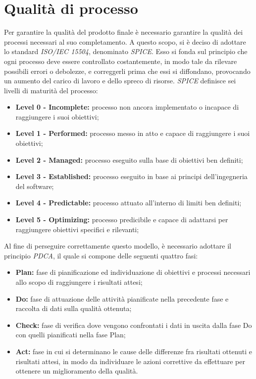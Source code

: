\newpage
\section{Qualità di processo}

	Per garantire la qualità del prodotto finale è necessario garantire la qualità dei processi necessari al suo completamento. A questo scopo, si è deciso di adottare lo standard \textit{ISO/IEC 15504}, denominato \textit{SPICE}.
	Esso si fonda sul principio che ogni processo deve essere controllato costantemente, in modo tale da rilevare possibili errori o debolezze, e correggerli prima che essi si diffondano, provocando un aumento del carico di lavoro e dello spreco di risorse.
	\textit{SPICE} definisce sei livelli di maturità del processo:
	
	\begin{itemize}
		\item \textbf{Level 0 - Incomplete:} processo non ancora implementato o incapace di raggiungere i suoi obiettivi;
		\item \textbf{Level 1 - Performed:} processo messo in atto e capace di raggiungere i suoi obiettivi;
		\item \textbf{Level 2 - Managed:} processo eseguito sulla base di obiettivi ben definiti;
		\item \textbf{Level 3 - Established:} processo eseguito in base ai principi dell’ingegneria del software; 
		\item \textbf{Level 4 - Predictable:} processo attuato all’interno di limiti ben definiti;
		\item \textbf{Level 5 - Optimizing:} processo predicibile e capace di adattarsi per raggiungere obiettivi specifici e rilevanti;
	\end{itemize}
	
	Al fine di perseguire correttamente questo modello, è necessario adottare il principio \textit{PDCA}, il quale si compone delle seguenti quattro fasi:
	
	\begin{itemize}
		\item \textbf{Plan:} fase di pianificazione ed individuazione di obiettivi e processi necessari allo scopo di raggiungere i risultati attesi;
		\item \textbf{Do:} fase di attuazione delle attività pianificate nella precedente fase e raccolta di dati sulla qualità ottenuta;
		\item \textbf{Check:} fase di verifica dove vengono confrontati i dati in uscita dalla fase Do con quelli pianificati nella fase Plan;
		\item \textbf{Act:} fase in cui si determinano le cause delle differenze fra risultati ottenuti e risultati attesi, in modo da individuare le azioni correttive da effettuare per ottenere un miglioramento della qualità.
	\end{itemize}

